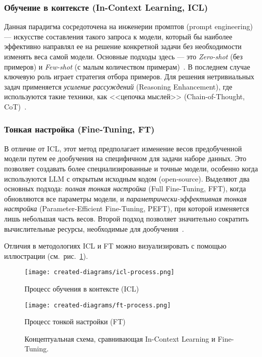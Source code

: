 \subsubsection{Обучение в контексте (In-Context Learning, ICL)}

Данная парадигма
сосредоточена на инженерии промптов (prompt engineering) --- искусстве составления
такого запроса к модели, который бы наиболее эффективно направлял ее на решение конкретной
задачи без необходимости изменять веса самой модели. Основные подходы
здесь --- это \textit{Zero-shot} (без примеров) и \textit{Few-shot}
(с малым количеством примерам)~\cite{zhuLargeLanguageModel2024}. В последнем случае ключевую
роль играет стратегия отбора примеров.
Для решения нетривиальных задач применяется \textit{усиление рассуждений}
(Reasoning Enhancement), где используются такие техники, как <<цепочка мыслей>>
(Chain-of-Thought, CoT)~\cite{zhuLargeLanguageModel2024,
      huangExploringLandscapeTexttoSQL2025}.

\subsubsection{Тонкая настройка (Fine-Tuning, FT)}

В отличие от ICL, этот метод предполагает
изменение весов предобученной модели путем ее дообучения на специфичном для задачи наборе данных.
Это позволяет создавать более специализированные и точные модели, особенно когда
используются LLM с открытым исходным кодом (open-source). Выделяют два основных
подхода: \textit{полная тонкая настройка} (Full Fine-Tuning, FFT), когда обновляются
все параметры модели, и \textit{параметрически-эффективная тонкая настройка}
(Parameter-Efficient Fine-Tuning, PEFT), при которой изменяется лишь небольшая
часть весов.
Второй подход позволяет значительно сократить вычислительные ресурсы, необходимые для
дообучения~\cite{huangExploringLandscapeTexttoSQL2025}.

Отличия в методологиях ICL и FT можно визуализировать с помощью иллюстрации (см.~рис.~\ref{fig:icl-vs-ft}).

\begin{figure}[h]
      \centering
      \begin{subcaptiongroup}
            \texttt{[image: created-diagrams/icl-process.png]}
            \caption{Процесс обучения в контексте (ICL)}
            \label{fig:icl-process}
            \texttt{[image: created-diagrams/ft-process.png]}
            \caption{Процесс тонкой настройки (FT)}
            \label{fig:ft-process}
      \end{subcaptiongroup}
      \captionsetup{subrefformat=parens}
      \caption{Концептуальная схема, сравнивающая In-Context Learning и Fine-Tuning.}
      \label{fig:icl-vs-ft}
\end{figure}

